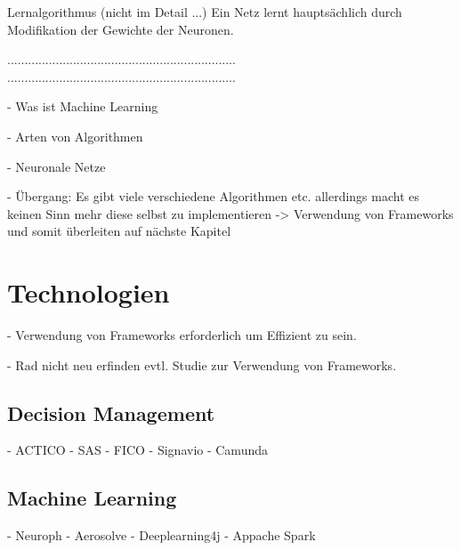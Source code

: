 Lernalgorithmus (nicht im Detail ...)
Ein Netz lernt hauptsächlich durch Modifikation der Gewichte der Neuronen.





..................................................................
..................................................................

- Was ist Machine Learning

- Arten von Algorithmen 

- Neuronale Netze 

- Übergang: Es gibt viele verschiedene Algorithmen etc. allerdings macht es keinen Sinn mehr diese selbst zu implementieren -> Verwendung von Frameworks und somit überleiten auf nächste Kapitel

\section{Technologien}
\label{sec:Technologien2}

- Verwendung von Frameworks erforderlich um Effizient zu sein.

- Rad nicht neu erfinden evtl. Studie zur Verwendung von Frameworks.

\subsection{Decision Management}
\label{subsec:Decision_Management2}

- ACTICO 
- SAS
- FICO 
- Signavio
- Camunda

\subsection{Machine Learning}
\label{subsec:Machine_Learning2}

- Neuroph
- Aerosolve 
- Deeplearning4j
- Appache Spark

